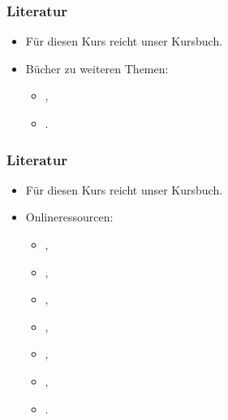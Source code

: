 \documentclass[aspectratio=169,mathserif,notheorems]{beamer}%
\begin{document}
%
\begin{frame}[t]\frametitle{Literatur}%
\begin{itemize}%
\item Für diesen Kurs reicht unser Kursbuch.%
\item Bücher zu weiteren Themen:\begin{itemize}%
\item {},%
\item {}.%
\end{itemize}%
\end{itemize}%
\end{frame}%
%
\begin{frame}[t]\frametitle{Literatur}%
\begin{itemize}%
\item Für diesen Kurs reicht unser Kursbuch.%
\item Onlineressourcen:\begin{itemize}%
\item {},
\item {},%
\item {},%
\item {},%
\item {},%
\item {},%
\item {}.%
\end{itemize}%
\end{itemize}%
\end{frame}%
%
\end{document}

